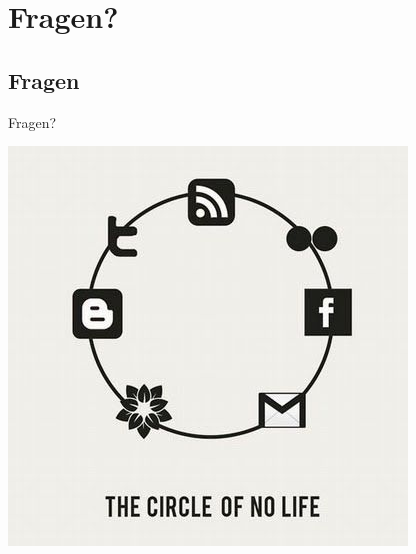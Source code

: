 \documentclass[18pt]{beamer}
\begin{document}
\section{Fragen?}
\subsection*{Fragen} %
\begin{frame}	
	\begin{center}
		\huge{Fragen?}
	\end{center}
\end{frame}



\begin{frame}[full]
\includegraphics[scale=0.55]{bilder/comics/September-25-2011-18-44-59-aa71ce1bd67502c27bc56a6b8d724897.jpeg}
\end{frame}
\end{document}
